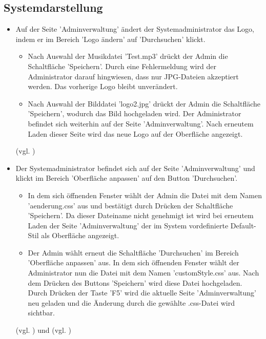 \documentclass[a4paper]{scrreprt}
\begin{document}
		\subsection{Systemdarstellung}
			\begin{itemize}
				 \item {} 
				 Auf der Seite 'Adminverwaltung' ändert der Systemadministrator das Logo, indem er im Bereich 'Logo ändern' auf 'Durchsuchen' klickt.
					\begin{itemize}
						\item Nach Auswahl der Musikdatei 'Test.mp3' drückt der Admin die Schaltfläche 'Speichern'. Durch eine Fehlermeldung wird der Administrator darauf hingwiesen, dass nur JPG-Dateien akzeptiert werden. Das vorherige Logo bleibt unverändert.
						
					 	\item Nach Auswahl der Bilddatei 'logo2.jpg' drückt der Admin die Schaltfläche 'Speichern', wodurch das Bild hochgeladen wird. Der Administrator befindet sich weiterhin auf der Seite 'Adminverwaltung'. Nach erneutem Laden dieser Seite wird das neue Logo auf der Oberfläche angezeigt.
					\end{itemize}
				 (vgl. )	
				
				 \item {}
				 Der Systemadministrator befindet sich auf der Seite 'Adminverwaltung' und klickt im Bereich 'Oberfläche anpassen' auf den Button 'Durchsuchen'. 
					\begin{itemize}
						 \item In dem sich öffnenden Fenster wählt der Admin die Datei mit dem Namen 'aenderung.css' aus und bestätigt durch Drücken der Schaltfläche 'Speichern'. Da dieser Dateiname nicht genehmigt ist wird bei erneutem Laden der Seite 'Adminverwaltung' der im System vordefinierte Default-Stil als Oberfläche angezeigt.
						 
						 \item Der Admin wählt erneut die Schaltfläche 'Durchsuchen' im Bereich 'Oberfläche anpassen' aus. In dem sich öffnenden Fenster wählt der Administrator nun die Datei mit dem Namen 'customStyle.css' aus. Nach dem Drücken des Buttons 'Speichern' wird diese Datei hochgeladen. Durch Drücken der Taste 'F5' wird die aktuelle Seite 'Adminverwaltung' neu geladen und die Änderung durch die gewählte .css-Datei wird sichtbar. 
					\end{itemize}
				 (vgl. ) und (vgl. )
				 
			\end{itemize}
			
\end{document}
